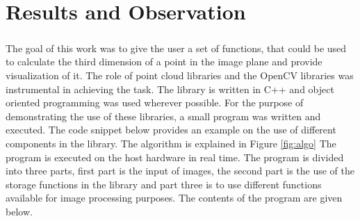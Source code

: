 
\chapter{Results and Observation}
\label{chap:Res}
\paragraph{}
The goal of this work was to give the user a set of functions, that could be used to calculate the third dimension of a point in the image plane and provide visualization of it. The role of point cloud libraries and the OpenCV libraries was instrumental in achieving the task. The library is written in C++ and object oriented programming was used wherever possible. For the purpose of demonstrating the use of these libraries, a small program was written and executed. The code snippet below provides an example on the use of different components in the library. The algorithm is explained in Figure \ref{fig:algo} The program is executed on the host hardware in real time. The program is divided into three parts, first part is the input of images, the second part is the use of the storage functions in the library and part three is to use different functions available for image processing purposes. The contents of the program are given below.

